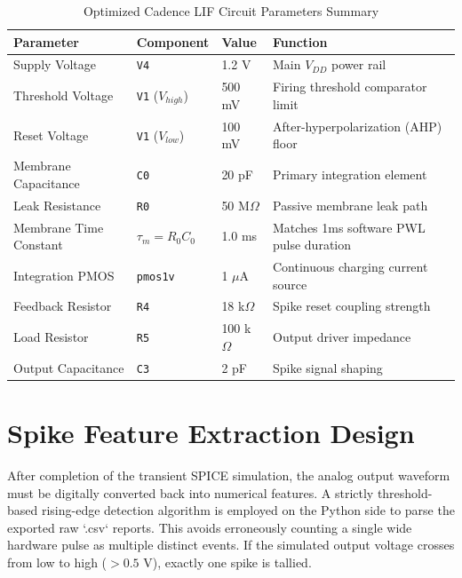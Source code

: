 \begin{table}[H]
\centering
\caption{Optimized Cadence LIF Circuit Parameters Summary}
\label{tab:circuitparams}
\begin{tabular}{|p{}|p{}|p{}|p{}|}
\hline
\textbf{Parameter} & \textbf{Component} & \textbf{Value} & \textbf{Function} \\
\hline
Supply Voltage & \texttt{V4} & 1.2 V & Main $V_{DD}$ power rail \\
\hline
Threshold Voltage & \texttt{V1} ($V_{high}$) & 500 mV & Firing threshold comparator limit \\
\hline
Reset Voltage & \texttt{V1} ($V_{low}$) & 100 mV & After-hyperpolarization (AHP) floor \\
\hline
Membrane Capacitance & \texttt{C0} & 20 pF & Primary integration element \\
\hline
Leak Resistance & \texttt{R0} & 50 M$\Omega$ & Passive membrane leak path \\
\hline
Membrane Time Constant & $\tau_m = R_0C_0$ & 1.0 ms & Matches 1ms software PWL pulse duration \\
\hline
Integration PMOS & \texttt{pmos1v} & 1 $\mu$A & Continuous charging current source \\
\hline
Feedback Resistor & \texttt{R4} & 18 k$\Omega$ & Spike reset coupling strength \\
\hline
Load Resistor & \texttt{R5} & 100 k$\Omega$ & Output driver impedance \\
\hline
Output Capacitance & \texttt{C3} & 2 pF & Spike signal shaping \\
\hline
\end{tabular}
\end{table}

\section{Spike Feature Extraction Design}

After completion of the transient SPICE simulation, the analog output waveform must be digitally converted back into numerical features. A strictly threshold-based rising-edge detection algorithm is employed on the Python side to parse the exported raw `.csv` reports. This avoids erroneously counting a single wide hardware pulse as multiple distinct events. If the simulated output voltage crosses from low to high ($>0.5\text{ V}$), exactly one spike is tallied. 

